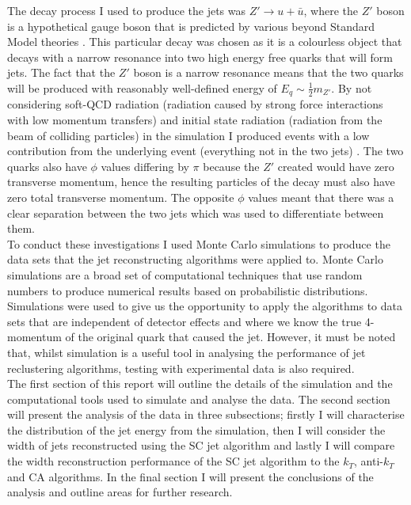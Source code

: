\documentclass[a4paper,11pt, onecolumn]{article}
\begin{document}
  The decay process I used to produce the jets was $Z' \to u + \bar{u}$, where the $Z'$ boson is a hypothetical gauge boson 
  that is predicted by various beyond Standard Model theories \cite{Zprime1, Zprime2, Zprime3}.
  This particular decay was chosen as it is a colourless object that decays with a narrow resonance into two high energy free quarks that will
  form jets. The fact that the $Z'$ boson is a narrow resonance means that the two quarks will be produced with reasonably well-defined energy of $E_q \sim \frac{1}{2} m_{Z'}$. By not considering 
  soft-QCD radiation (radiation caused by strong force interactions with low momentum transfers) and initial state radiation (radiation from the beam of colliding 
  particles) in the simulation I produced events with a low contribution from the underlying event (everything not in the two jets) \cite{underlyingevent}.
  The two quarks also have $\phi$ values differing by $\pi$ because the $Z'$ created would have zero transverse momentum, hence the 
  resulting particles of the decay must also have zero total transverse momentum. The opposite $\phi$ values meant that 
  there was a clear separation between the two jets which was used to differentiate between them. \\

  To conduct these investigations I used Monte Carlo simulations to produce the data sets that the jet reconstructing algorithms were applied to. Monte Carlo
  simulations are a broad set of computational techniques that use random numbers to produce numerical results based on probabilistic distributions.
  Simulations were used to give us the opportunity to apply the algorithms to data sets that are independent of detector effects and where we know the true
  4-momentum of the original quark that caused the jet. However, it must be noted that, whilst simulation is a useful tool in analysing the 
  performance of jet reclustering algorithms, testing with experimental data is also required. \\

  The first section of this report will outline the details  of the simulation and the computational tools used to simulate and analyse the data. 
  The second section will present the analysis of the data in three subsections; firstly I will characterise the distribution of the jet energy from the simulation, 
  then I will consider the width of jets reconstructed using the SC jet algorithm and lastly I will compare the width reconstruction performance of the SC jet algorithm
  to the $k_{T}$, anti-$k_T$ and CA algorithms. 
  In the final section I will present the conclusions of the analysis and outline areas for further research.
 
\end{document}

